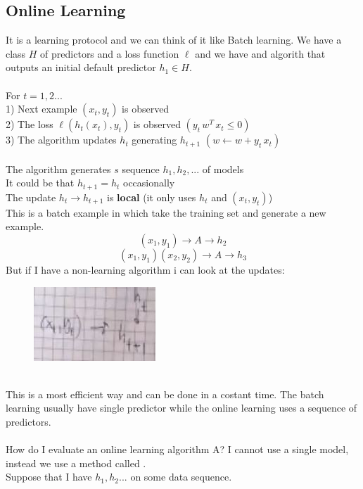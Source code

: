 \documentclass[../main.tex]{subfiles}
\begin{document}
\subsection{Online Learning }
It is a learning protocol and we can think of it like Batch learning.
We have a class $H$ of predictors and a loss function $\ell$ and we have and algorith that outputs an initial default predictor $h_1 \in H$.
\\\\
For $t = 1,2 ...$\\
1) Next example $(x_t, y_t)$ is observed \\
2) The loss $\ell ( h_t(x_t), y_t)$ is observed \qquad $(y_t \, w^T \, x_t \leq 0 )$
\\
3) The algorithm updates $h_t$ generating $h_{t+1}$ \qquad $(w \leftarrow w + y_t \, x_t)$
\\\\
The algorithm generates $s$ sequence $h_1, h_2, ...$ of models\\
It could be that $h_{t+1} = h_t$ occasionally 
\\
The update $h_t \rightarrow h_{t+1}$ is \textbf{local} (it only uses $h_t$ and $(x_t, y_t)$)
\\
This is a batch example in which take the training set and generate a new example.
$$
(x_1,y_1) \rightarrow A \rightarrow h_2
$$
$$
(x_1,y_1) (x_2,y_2) \rightarrow A \rightarrow h_3
$$
But if I have a non-learning algorithm i can look at the updates: 
\begin{figure}[h]
    \centering
    \includegraphics[width=0.3\linewidth]{../img/lez14-img2.JPG}
    \caption{}
\end{figure}\\
This is a most efficient way and can be done in a costant time.
The batch learning usually have single predictor while the online learning uses a sequence of predictors.
\\\\
How do I evaluate an online learning algorithm A?
I cannot use a single model, instead we use a method called . \\
Suppose that I have $h_1, h_2 ...$ on some data sequence.
\\
\end{document}

